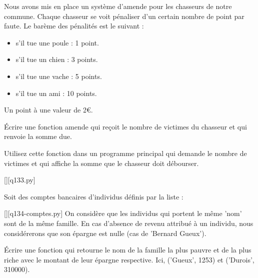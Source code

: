 
        \question
Nous avons mis en place un système d'amende pour les chasseurs de notre commune.
Chaque chasseur se voit pénaliser d'un certain nombre de point par faute.
Le barème des pénalités est le suivant :
\begin{itemize}
\item s'il tue une poule : 1 point.
\item s'il tue un chien : 3 points.
\item s'il tue une vache : 5 points.
\item s'il tue un ami : 10 points.
\end{itemize}
Un point à une valeur de 2€.

Écrire une fonction amende qui reçoit le nombre de victimes du chasseur et qui renvoie la somme due.

Utilisez cette fonction dans un programme principal qui demande le nombre de victimes et qui affiche la somme que le chasseur doit débourser.

        \begin{solution}
                \renewcommand{\nomfichier}{q133.py}
                \pythonfile{\chemincode \nomfichier}[][\nomfichier]
        \end{solution}
\question
Soit des comptes bancaires d'individus définis par la liste :\par
\renewcommand{\nomfichier}{q134-comptes.py}
\pythonfile{\chemincode \nomfichier}[][\nomfichier]
On considère que les individus qui portent le même 'nom' sont de la même famille.
En cas d'absence de revenu attribué à un individu, nous considérerons que son épargne est nulle (cas de 'Bernard Gueux').

Écrire une fonction qui retourne le nom de la famille la plus pauvre et de la plus riche avec le montant de leur épargne respective.
Ici, ('Gueux', 1253) et ('Durois', 310000).

